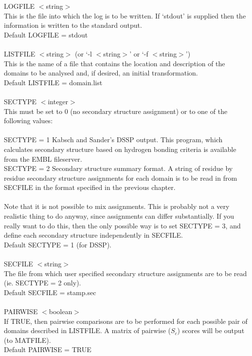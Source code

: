 LOGFILE $<$string$>$\\
This is the file into which the log is to be written.  If
`stdout' is supplied then the information is written to the
standard output.\\
Default LOGFILE = stdout\\
\\
LISTFILE $<$string$>$ (or `-l $<$string$>$' or `-f $<$string$>$')\\
This is the name of a file that contains the location and
description of the domains to be analysed and, if desired, an
initial transformation.\\  
Default LISTFILE = domain.list\\
\\
SECTYPE $<$integer$>$\\
This must be set to 0 (no secondary structure assignment) or
to one of the following values:\\
\\
SECTYPE = 1 Kabsch and Sander's DSSP output.  This program, which
calculates secondary structure based on hydrogen bonding criteria 
\cite{dssp} is available from the EMBL fileserver.
\\
SECTYPE = 2 Secondary structure summary format.  A string of residue by
residue secondary structure assignments for each domain is to be 
read in from SECFILE in the format specified in the previous chapter.\\
\\
Note that it is not possible to mix assignments.  This is probably
not a very realistic thing to do anyway, since assignments can
differ substantially.  If you really want to do this, then the only
possible way is to set SECTYPE = 3, and define each secondary structure
independently in SECFILE.\\
Default SECTYPE = 1 (for DSSP).\\
\\
SECFILE $<$string$>$\\
The file from which user specified secondary structure assignments
are to be read (ie. SECTYPE = 2 only).\\
Default SECFILE = stamp.sec\\
\\
PAIRWISE $<$boolean$>$\\
If TRUE, then pairwise comparisons are to be performed for each 
possible pair of domains described in LISTFILE.  A matrix of
pairwise ($S_{c}$) scores will be output (to MATFILE).\\
Default PAIRWISE = TRUE\\
